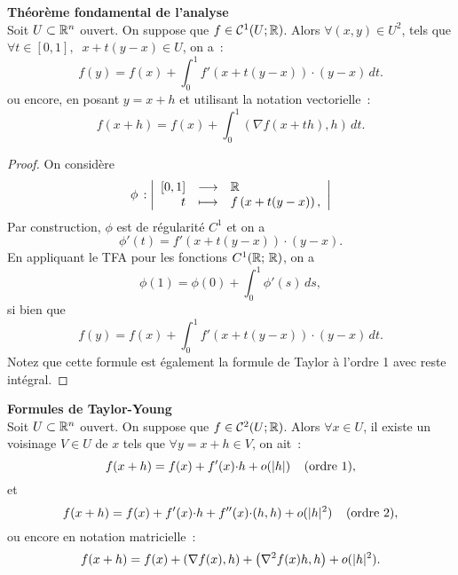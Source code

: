 \begin{theorem}\label{taf4}\textbf{Théorème fondamental de l'analyse}\\
Soit \(U\subset \mathbb{R}^n\) ouvert. On suppose que \(f\in\mathcal{C}^1(U; \mathbb{R})\). Alors \(\forall (x,y)\in U^2\), tels que \(\forall t\in [0,1], \;\;x+t(y-x)\in U\),  on a~:
\begin{equation*}
f(y) = f(x) + \int_0^1 f'(x+t(y-x))\cdot(y-x)\,dt.
\end{equation*}
ou encore, en posant \(y=x+h\) et utilisant la notation vectorielle~:
\begin{equation*}
f(x+h) = f(x) + \int_0^1 \left(\nabla f(x+th),h\right)\,dt.
\end{equation*}
\end{theorem}
\begin{proof}
On considère \begin{displaymath}
\phi\,:
\left|
  \begin{array}{rcl}
    [0,1] & \longrightarrow &\R \\
    t & \longmapsto & f\left(x + t (y-x)\right),\\
  \end{array}
\right| %
\end{displaymath}
Par construction, \(\phi\) est de régularité \(C^1\) et on a
\begin{equation*}
\phi'(t) = f'\left(x + t (y-x)\right)\cdot(y-x).
\end{equation*}
En appliquant le TFA pour les fonctions \(C^1(\mathbb{R};\,\mathbb{R})\), on a 
\begin{equation*}
\phi(1) = \phi(0) + \int_0^1 \phi'(s)\,ds,
\end{equation*}
si bien que
\begin{equation*}
f(y) = f(x) + \int_0^1 f'(x+t(y-x))\cdot(y-x)\,dt.
\end{equation*}
Notez que cette formule est également la formule de Taylor à l'ordre 1 avec reste intégral.
\end{proof}
\vspace{1cm}
\begin{proposition}\label{taf5}\textbf{Formules de Taylor-Young}\\
Soit \(U\subset \mathbb{R}^n\) ouvert. On suppose que \(f\in\mathcal{C}^2(U; \mathbb{R})\). Alors \(\forall x \in U\), il existe un voisinage \(V\in U\) de \(x\)  tels que \(\forall y=x+h \in V\), on ait~:
\begin{equation*}
f(x+h) = f(x) + f'(x){\cdot} h + o(\mathopen{}\left|h\right|\mathclose{}) \;\;\;\;\mbox{(ordre 1)},
\end{equation*}
et 
\begin{equation*}
f(x+h) = f(x) + f'(x){\cdot} h + f''(x){\cdot}(h,h) + o(\mathopen{}\left|h\right|\mathclose{}^2) \;\;\;\;\mbox{(ordre 2)},
\end{equation*}
ou encore en notation matricielle~:
\begin{equation*}
f(x+h) = f(x) + \left(\nabla f(x), h\right) + \left( \nabla^2 f(x)h, h\right) + o(\mathopen{}\left|h\right|\mathclose{}^2).
\end{equation*}
\end{proposition}
